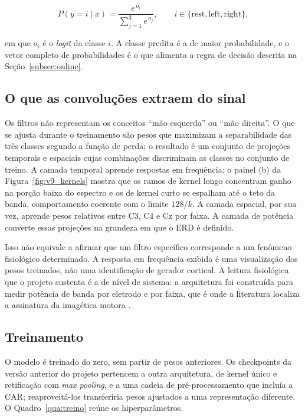 \documentclass[12pt,a4paper]{article}
\begin{document}
\begin{equation}\label{eq:softmax}
P(y = i \mid x) = \frac{e^{\,o_i}}{\sum_{j=1}^{3} e^{\,o_j}}, \qquad i \in \{\text{rest}, \text{left}, \text{right}\},
\end{equation}

\noindent em que $o_i$ é o \textit{logit} da classe $i$. A classe predita é a de maior
probabilidade, e o vetor completo de probabilidades é o que alimenta a regra de decisão
descrita na Seção~\ref{subsec:online}.

\subsection{O que as convoluções extraem do sinal}

Os filtros não representam os conceitos ``mão esquerda'' ou ``mão direita''. O que se ajusta
durante o treinamento são pesos que maximizam a separabilidade das três classes segundo a
função de perda; o resultado é um conjunto de projeções temporais e espaciais cujas
combinações discriminam as classes no conjunto de treino. A camada temporal aprende respostas
em frequência: o painel (b) da Figura~\ref{fig:v9_kernels} mostra que os ramos de kernel longo
concentram ganho na porção baixa do espectro e os de kernel curto se espalham até o teto da
banda, comportamento coerente com o limite $128/k$. A camada espacial, por sua vez, aprende
pesos relativos entre C3, C4 e Cz por faixa. A camada de potência converte essas projeções na
grandeza em que o ERD é definido.

Isso não equivale a afirmar que um filtro específico corresponde a um fenômeno fisiológico
determinado. A resposta em frequência exibida é uma visualização dos pesos treinados, não uma
identificação de gerador cortical. A leitura fisiológica que o projeto sustenta é a de nível
de sistema: a arquitetura foi construída para medir potência de banda por eletrodo e por
faixa, que é onde a literatura localiza a assinatura da imagética motora
\cite{pfurtscheller1999,pfurtscheller2001}.

\subsection{Treinamento}\label{subsec:treinamento}

O modelo é treinado do zero, sem partir de pesos anteriores. Os checkpoints da versão anterior
do projeto pertencem a outra arquitetura, de kernel único e retificação com \textit{max
pooling}, e a uma cadeia de pré-processamento que incluía a CAR; reaproveitá-los transferiria
pesos ajustados a uma representação diferente. O Quadro~\ref{qua:treino} reúne os
hiperparâmetros.
\end{document}
